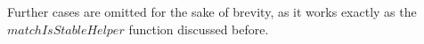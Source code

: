 {\begin{code}
\AgdaDottedPattern{\AgdaSymbol{)}}\AgdaSpace{}%
\AgdaSpace{}%
\AgdaDottedPattern{\AgdaSymbol{(}}\AgdaSpace{}%
\AgdaDottedPattern{\AgdaOperator{\AgdaInductiveConstructor{,}}}\AgdaSpace{}%
\AgdaDottedPattern{\AgdaSymbol{)}}\AgdaSpace{}%
\AgdaSpace{}%
\AgdaDottedPattern{\AgdaInductiveConstructor{[]}}\AgdaDottedPattern{\AgdaSymbol{)}}\AgdaSymbol{)}\<%
\\
\>[.][@{}l@{}]\<[3650I]%
\>[31]\AgdaSymbol{(}\AgdaSpace{}%
\AgdaSymbol{(}\AgdaSpace{}%
\AgdaSymbol{(}\AgdaSpace{}%
\AgdaSymbol{())))}\<%
\\
%
\>[31]\<%
\end{code}

Further cases are omitted for the sake of brevity, as it works exactly as the $matchIsStableHelper$ function discussed before.

}

